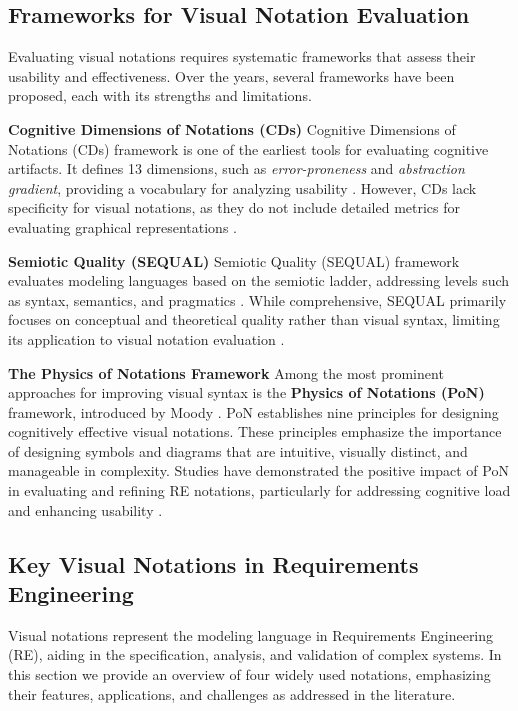 \documentclass[runningheads]{llncs}
\begin{document}
\subsection{Frameworks for Visual Notation Evaluation}

Evaluating visual notations requires systematic frameworks that assess their usability and effectiveness. Over the years, several frameworks have been proposed, each with its strengths and limitations.

\textbf{Cognitive Dimensions of Notations (CDs)}
Cognitive Dimensions of Notations (CDs) framework is one of the earliest tools for evaluating cognitive artifacts. It defines 13 dimensions, such as \textit{error-proneness} and \textit{abstraction gradient}, providing a vocabulary for analyzing usability \cite{Green1989}. However, CDs lack specificity for visual notations, as they do not include detailed metrics for evaluating graphical representations \cite{Moody2010}.

\textbf{Semiotic Quality (SEQUAL)}
 Semiotic Quality (SEQUAL) framework evaluates modeling languages based on the semiotic ladder, addressing levels such as syntax, semantics, and pragmatics \cite{Lindland1994}. While comprehensive, SEQUAL primarily focuses on conceptual and theoretical quality rather than visual syntax, limiting its application to visual notation evaluation \cite{Moody2009}.

\textbf{The Physics of Notations Framework}
Among the most prominent approaches for improving visual syntax is the \textbf{Physics of Notations (PoN)} framework, introduced by Moody \cite{Moody2009}. PoN establishes nine principles for designing cognitively effective visual notations. These principles emphasize the importance of designing symbols and diagrams that are intuitive, visually distinct, and manageable in complexity. Studies have demonstrated the positive impact of PoN in evaluating and refining RE notations, particularly for addressing cognitive load and enhancing usability \cite{Moody2010, Genon2011, ElGhafar2014}.

\subsection{Key Visual Notations in Requirements Engineering}
Visual notations represent the modeling language in Requirements Engineering (RE), aiding in the specification, analysis, and validation of complex systems. In this section we provide an overview of four widely used notations, emphasizing their features, applications, and challenges as addressed in the literature.
\end{document}
